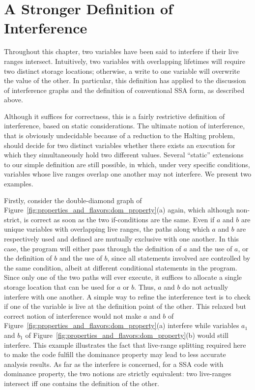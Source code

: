 \section{A Stronger Definition of Interference}
\label{sec:properties_and_flavors:ultimate_interference}
Throughout this chapter, two variables have been said to interfere
if their live ranges intersect. Intuitively, two variables with overlapping
lifetimes will require two distinct storage locations; otherwise, a write
to one variable will overwrite the value of the other. In particular,
this definition has applied to the discussion of interference graphs
and the definition of conventional SSA form, as described above.

Although it suffices
for correctness, this is a fairly restrictive definition of interference, based on static considerations. 
The ultimate notion of interference, that is obviously undecidable because of a reduction to the Halting problem, should decide for two distinct variables whether there exists an execution for which they simultaneously hold two different values. 
Several ``static'' extensions to our simple definition are still possible, in which,
under very specific conditions, variables whose live ranges overlap
one another may not interfere. 
We present two examples.

Firstly, consider the double-diamond graph of Figure~\ref{fig:properties_and_flavors:dom_property}(a) again, which although non-strict, is correct as soon as the two if-conditions are the same.
Even if $a$ and $b$ are unique variables with overlapping live
ranges, the paths along which $a$ and $b$ are respectively used and
defined are mutually exclusive with one another. In this case, the
program will either pass through the definition of $a$ and the use
of $a$, or the definition of $b$ and the use of $b$, since all
statements involved are controlled by the same condition, albeit
at different conditional statements in the program. Since only
one of the two paths will ever execute, it suffices to allocate a 
single storage location that can be used for $a$ or $b$. Thus, $a$
and $b$ do not actually interfere with one another. A simple way to refine the interference test is to 
check if one of the variable is live at the definition point of the other. 
This relaxed but correct notion of interference would not make $a$ and $b$ of Figure~\ref{fig:properties_and_flavors:dom_property}(a) interfere while variables $a_1$ and $b_1$ of Figure~\ref{fig:properties_and_flavors:dom_property}(b) would still interfere. This example illustrates the fact that live-range splitting required here to make the code fulfill the dominance property may lead to less accurate analysis results.
As far as the interfere is concerned, for a SSA code with dominance property, the two notions are strictly equivalent: two live-ranges intersect iff one contains the definition of the other.  

